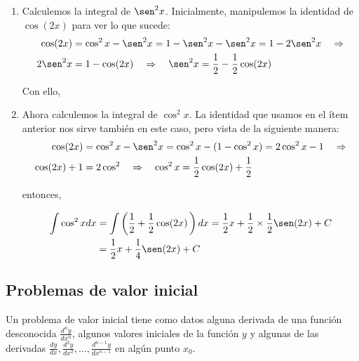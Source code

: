 \begin{enumerate}[leftmargin=1.2em,   itemindent=0pt,       labelwidth=\labelwidth,labelsep=0.5em,]

\item Calculemos la integral de $\sen ^{2}x$. Inicialmente, manipulemos la identidad de $\cos(2x)$ para ver lo que sucede:
\begin{align*}
\cos (2x)&=\cos^{2}x-\sen^{2}x%
=1-\sen^{2}x-\sen^{2}x=1-2\sen ^{2}x\quad \Rightarrow\\
2\sen^{2}x&=1-\cos (2x)\quad \Rightarrow\quad \sen^{2}x=\frac{1}{2}-\frac{1}{2}\cos (2x)
\end{align*}

Con ello,



\item Ahora calculemos la integral de $\cos ^{2}x$. La identidad que usamos en el ítem anterior nos sirve también en este caso, pero vista de la siguiente manera:
{\small
\begin{align*}
\cos (2x)&=\cos ^{2}x-\sen ^{2}x=\cos^{2}x-(1-\cos ^{2}x)=2\cos^{2}x-1\quad \Rightarrow\\
\cos(2x)+1&=2\cos^{2}\quad \Rightarrow \quad \cos^{2}x=\frac{1}{2}\cos(2x)+\frac{1}{2}
\end{align*}
}

entonces,

{\small
\begin{align*}
\int \cos ^{2}xdx&=\int\left( \frac{1}{2}+\frac{1}{2}\cos (2x)\,\right) dx=\frac{1}{2}x+\frac{1}{2}\times \frac{1}{2}\sen (2x)+C \\
&=\frac{1}{2}x+\frac{1}{4}\sen (2x)+C 
\end{align*}
}
\end{enumerate}

\subsection*{Problemas de valor inicial}

Un problema de valor inicial tiene como datos alguna derivada de una función desconocida $\frac{d^{n}y}{dx^{n}}$, algunos valores iniciales de la
función $y$ y algunas de las derivadas $\frac{dy}{dx},\frac{d^{2}y}{dx^{2}},...,\frac{d^{n-1}y}{dx^{n-1}}$ en algún punto $x_{0}.$

